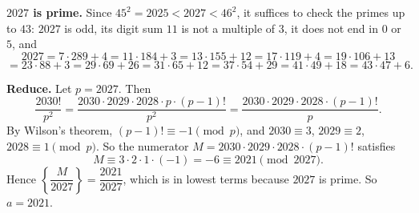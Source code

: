 \textbf{$2027$ is prime.} Since $45^2=2025<2027<46^2$, it suffices to check the primes up to $43$: $2027$ is odd, its digit sum $11$ is not a multiple of $3$, it does not end in $0$ or $5$, and
\[2027=7\cdot289+4=11\cdot184+3=13\cdot155+12=17\cdot119+4=19\cdot106+13\]
\[=23\cdot88+3=29\cdot69+26=31\cdot65+12=37\cdot54+29=41\cdot49+18=43\cdot47+6.\]

\textbf{Reduce.} Let $p=2027$. Then
\[\dfrac{2030!}{p^2}=\dfrac{2030\cdot2029\cdot2028\cdot p\cdot(p-1)!}{p^2}=\dfrac{2030\cdot2029\cdot2028\cdot(p-1)!}{p}.\]
By Wilson's theorem, $(p-1)!\equiv-1\pmod p$, and $2030\equiv3$, $2029\equiv2$, $2028\equiv1\pmod p$. So the numerator $M=2030\cdot2029\cdot2028\cdot(p-1)!$ satisfies
\[M\equiv3\cdot2\cdot1\cdot(-1)=-6\equiv2021\pmod{2027}.\]
Hence $\left\{\dfrac{M}{2027}\right\}=\dfrac{2021}{2027}$, which is in lowest terms because $2027$ is prime. So $a=\boxed{2021}$.
